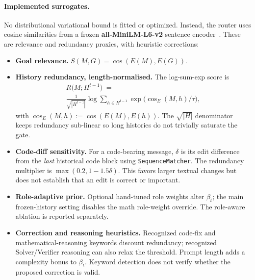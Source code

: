 \documentclass[11pt,twoside,twocolumn,letterpaper]{article}
\begin{document}
\paragraph{Implemented surrogates.} No distributional variational bound is fitted or optimized. Instead, the router uses cosine similarities from a frozen \textbf{all-MiniLM-L6-v2} sentence encoder~\cite{reimers2019sentence}. These are relevance and redundancy proxies, with heuristic corrections:
\begin{itemize}
\item \textbf{Goal relevance.} $S(M,G)=\cos(E(M), E(G))$.
\item \textbf{History redundancy, length-normalised.}
The log-sum-exp score is
\begin{multline}\label{eq:in_est}
R\bigl(M; H^{t-1}\bigr) \;=\; \\
\frac{1}{\sqrt{|H^{t-1}|}}\log\sum_{h \in H^{t-1}} \exp\!\bigl(\cos_{E}(M, h)/\tau\bigr),
\end{multline}
with $\cos_E(M,h) := \cos(E(M), E(h))$. The $\sqrt{|H|}$ denominator keeps redundancy sub-linear so long histories do not trivially saturate the gate.
\item \textbf{Code-diff sensitivity.} For a code-bearing message, $\delta$ is its edit difference from the \emph{last} historical code block using \texttt{SequenceMatcher}. The redundancy multiplier is $\max(0.2,1-1.5\delta)$. This favors larger textual changes but does not establish that an edit is correct or important.
\item \textbf{Role-adaptive prior.} Optional hand-tuned role weights alter $\beta_t$; the main frozen-history setting disables the math role-weight override. The role-aware ablation is reported separately.
\item \textbf{Correction and reasoning heuristics.} Recognized code-fix and mathematical-reasoning keywords discount redundancy; recognized Solver/Verifier reasoning can also relax the threshold. Prompt length adds a complexity bonus to $\beta_t$. Keyword detection does not verify whether the proposed correction is valid.
\end{itemize}
\end{document}
